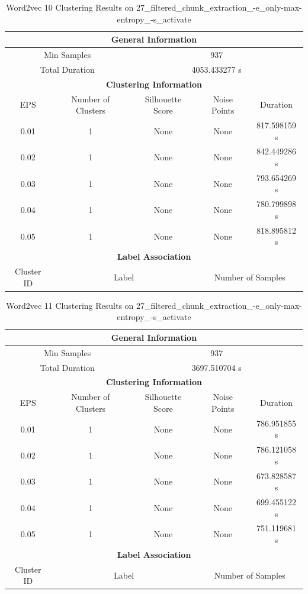 \begin{longtable}{|c|c|c|c|c|}
\caption{Word2vec 10 Clustering Results on 27\_filtered\_chunk\_extraction\_-e\_only-max-entropy\_-s\_activate} \label{tab:27_filtered_chunk_extraction_-e_only-max-entropy_-s_activate_word2vec_10_clustering_results}\\
\hline
\multicolumn{5}{|c|}{\textbf{General Information}} \\
\hline
\multicolumn{2}{|c|}{Min Samples} & \multicolumn{3}{c|}{937} \\
\multicolumn{2}{|c|}{Total Duration} & \multicolumn{3}{c|}{4053.433277 s} \\
\hline
\multicolumn{5}{|c|}{\textbf{Clustering Information}} \\
\hline
EPS & Number of Clusters & Silhouette Score & Noise Points & Duration \\
0.01 & 1 & None & None & 817.598159 s\\
0.02 & 1 & None & None & 842.449286 s\\
0.03 & 1 & None & None & 793.654269 s\\
0.04 & 1 & None & None & 780.799898 s\\
0.05 & 1 & None & None & 818.895812 s\\
\hline
\multicolumn{5}{|c|}{\textbf{Label Association}} \\
\hline
Cluster ID & \multicolumn{2}{c|}{Label} & \multicolumn{2}{c|}{Number of Samples} \\
\hline
\end{longtable}


\begin{longtable}{|c|c|c|c|c|}
\caption{Word2vec 11 Clustering Results on 27\_filtered\_chunk\_extraction\_-e\_only-max-entropy\_-s\_activate} \label{tab:27_filtered_chunk_extraction_-e_only-max-entropy_-s_activate_word2vec_11_clustering_results}\\
\hline
\multicolumn{5}{|c|}{\textbf{General Information}} \\
\hline
\multicolumn{2}{|c|}{Min Samples} & \multicolumn{3}{c|}{937} \\
\multicolumn{2}{|c|}{Total Duration} & \multicolumn{3}{c|}{3697.510704 s} \\
\hline
\multicolumn{5}{|c|}{\textbf{Clustering Information}} \\
\hline
EPS & Number of Clusters & Silhouette Score & Noise Points & Duration \\
0.01 & 1 & None & None & 786.951855 s\\
0.02 & 1 & None & None & 786.121058 s\\
0.03 & 1 & None & None & 673.828587 s\\
0.04 & 1 & None & None & 699.455122 s\\
0.05 & 1 & None & None & 751.119681 s\\
\hline
\multicolumn{5}{|c|}{\textbf{Label Association}} \\
\hline
Cluster ID & \multicolumn{2}{c|}{Label} & \multicolumn{2}{c|}{Number of Samples} \\
\hline
\end{longtable}


